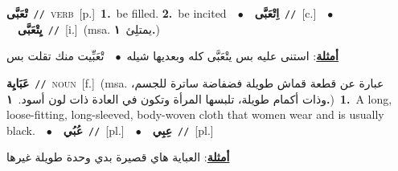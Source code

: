 \documentclass[10pt,a4paper,twoside]{article} %
\begin{document}
\begin{multicols}{2}
{\setlength\topsep{0pt}\textbf{\foreignlanguage{arabic}{تْعَبَّى}}\ {\color{gray}\texttt{//}\color{black}}\ \textsc{verb}\ [p.]\ \textbf{1.}~be filled.  \textbf{2.}~be incited\ \ $\bullet$\ \ \setlength\topsep{0pt}\textbf{\foreignlanguage{arabic}{اِتْعَبَّى}}\ {\color{gray}\texttt{//}\color{black}}\ [c.]\ \ $\bullet$\ \ \setlength\topsep{0pt}\textbf{\foreignlanguage{arabic}{يِتْعَبَّى}}\ {\color{gray}\texttt{//}\color{black}}\ [i.]\ \color{gray}(msa. \foreignlanguage{arabic}{يمتلِئ}~\foreignlanguage{arabic}{\textbf{١.}})\color{black}\  \begin{flushright}\color{gray}\foreignlanguage{arabic}{\textbf{\underline{\foreignlanguage{arabic}{أمثلة}}}: استنى عليه بس يتْعَبَّى كله وبعديها شيله\ $\bullet$\ \  تْعَبِّيت منك تقلت بس}\end{flushright}\color{black}} \vspace{2mm}

{\setlength\topsep{0pt}\textbf{\foreignlanguage{arabic}{عَبَايِة}}\ {\color{gray}\texttt{//}\color{black}}\ \textsc{noun}\ [f.]\ \color{gray}(msa. \foreignlanguage{arabic}{عبارة عن قطعة قماش طويلة فضفاضة ساترة للجسم، وذات أكمام طويلة، تلبسها المرأة وتكون في العادة ذات لون أسود.}~\foreignlanguage{arabic}{\textbf{١.}})\color{black}\ \textbf{1.}~A long, loose-fitting, long-sleeved, body-woven cloth that women wear and is usually black.\ \ $\bullet$\ \ \setlength\topsep{0pt}\textbf{\foreignlanguage{arabic}{عُبُي}}\ {\color{gray}\texttt{//}\color{black}}\ [pl.]\ \ $\bullet$\ \ \setlength\topsep{0pt}\textbf{\foreignlanguage{arabic}{عِبِي}}\ {\color{gray}\texttt{//}\color{black}}\ [pl.]\  \begin{flushright}\color{gray}\foreignlanguage{arabic}{\textbf{\underline{\foreignlanguage{arabic}{أمثلة}}}: العباية هاي قصيرة بدي وحدة طويلة غيرها}\end{flushright}\color{black}} \vspace{2mm}


\end{multicols}
\end{document}
